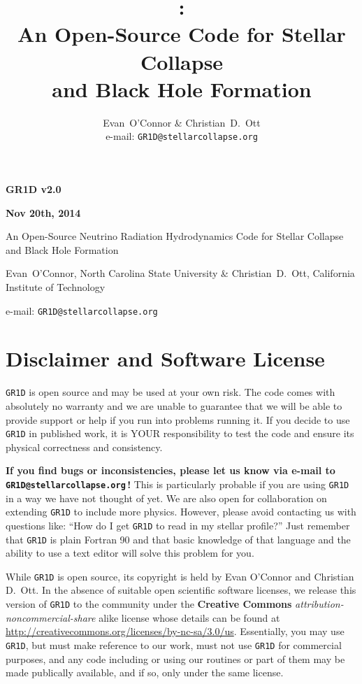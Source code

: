 \documentclass[10pt,nofootinbib]{article}
\title{\code{GR1D}:\\ An Open-Source Code for Stellar Collapse\\
 and Black Hole Formation}
\author{Evan\ O'Connor \& Christian\ D.\ Ott\\e-mail: {\tt GR1D@stellarcollapse.org}}
\newcommand{\code}[1]{\texttt{#1}}
\begin{document}
\begin{center}
\Large \bf GR1D v2.0 \rm \normalsize

 \bf Nov 20th, 2014 \rm

 \large An Open-Source Neutrino Radiation Hydrodynamics Code for
 Stellar Collapse and Black Hole Formation \normalsize

Evan\ O'Connor, North Carolina State University \& Christian\ D.\ Ott, California Institute of Technology

e-mail: {\tt GR1D@stellarcollapse.org}

\end{center}


\section{Disclaimer and Software License}
\code{GR1D} is open source and may be used at your own risk.  The code
comes with absolutely no warranty and we are unable to guarantee that
we will be able to provide support or help if you run into problems
running it. If you decide to use \code{GR1D} in published work, it is
YOUR responsibility to test the code and ensure its physical
correctness and consistency. 

{\bf If you find bugs or inconsistencies, please let us know via
  e-mail to \\ {\tt GR1D@stellarcollapse.org}\,!} This is particularly
probable if you are using \code{GR1D} in a way we have not thought of
yet.  We are also open for collaboration on extending \code{GR1D} to
include more physics. However, please avoid contacting us with
questions like: ``How do I get \code{GR1D} to read in my stellar
profile?'' Just remember that \code{GR1D} is plain Fortran 90 and that
basic knowledge of that language and the ability to use a text editor
will solve this problem for you.

While \code{GR1D} is open source, its copyright is held by Evan
O'Connor and Christian D.\ Ott. In the absence of suitable open
scientific software licenses, we release this version of \code{GR1D}
to the community under the {\bf Creative Commons}
\emph{attribution-noncommercial-share} alike license whose details can
be found at
\url{http://creativecommons.org/licenses/by-nc-sa/3.0/us}. Essentially,
you may use \code{GR1D}, but must make reference to our work, must not
use \code{GR1D} for commercial purposes, and any code including or
using our routines or part of them may be made publically available,
and if so, only under the same license.
\end{document}
